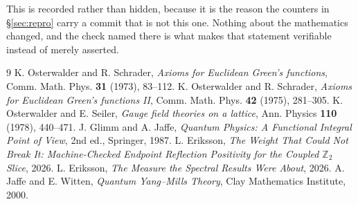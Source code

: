\documentclass[11pt]{article}
\theoremstyle{definition}
\newcommand{\Z}{\mathbb{Z}}
\begin{document}
This is recorded rather than hidden, because it is the reason the counters in
\S\ref{sec:repro} carry a commit that is not this one.  Nothing about the
mathematics changed, and the check named there is what makes that statement
verifiable instead of merely asserted.

\begin{thebibliography}{9}
\setlength{\itemsep}{0pt}
 K. Osterwalder and R. Schrader,
  \emph{Axioms for Euclidean Green's functions},
  Comm. Math. Phys. \textbf{31} (1973), 83--112.
 K. Osterwalder and R. Schrader,
  \emph{Axioms for Euclidean Green's functions II},
  Comm. Math. Phys. \textbf{42} (1975), 281--305.
 K. Osterwalder and E. Seiler,
  \emph{Gauge field theories on a lattice},
  Ann. Physics \textbf{110} (1978), 440--471.
 J. Glimm and A. Jaffe,
  \emph{Quantum Physics: A Functional Integral Point of View},
  2nd ed., Springer, 1987.
 L. Eriksson,
  \emph{The Weight That Could Not Break It: Machine-Checked Endpoint Reflection
  Positivity for the Coupled $\Z_2$ Slice}, 2026.
 L. Eriksson,
  \emph{The Measure the Spectral Results Were About}, 2026.
 A. Jaffe and E. Witten,
  \emph{Quantum Yang--Mills Theory}, Clay Mathematics Institute, 2000.
\end{thebibliography}
\end{document}
